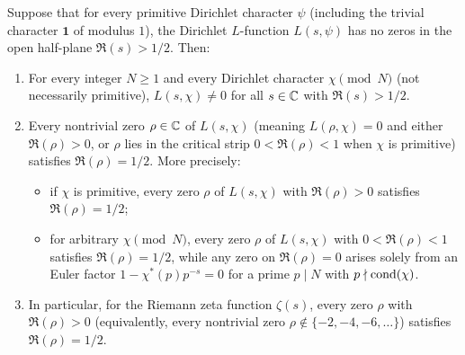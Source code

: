 \begin{proposition}
\label{prop:01:imprimitive}
Suppose that for every primitive Dirichlet character $\psi$ (including the trivial character $\mathbf{1}$ of modulus $1$), the Dirichlet $L$-function $L(s, \psi)$ has no zeros in the open half-plane $\Re(s) > 1/2$. Then:
\begin{enumerate}[label=\textup{(\roman*)}]
\item For every integer $N \ge 1$ and every Dirichlet character $\chi \pmod{N}$ (not necessarily primitive), $L(s, \chi) \neq 0$ for all $s \in \mathbb{C}$ with $\Re(s) > 1/2$.
\item Every nontrivial zero $\rho \in \mathbb{C}$ of $L(s, \chi)$ (meaning $L(\rho, \chi) = 0$ and either $\Re(\rho) > 0$, or $\rho$ lies in the critical strip $0 < \Re(\rho) < 1$ when $\chi$ is primitive) satisfies $\Re(\rho) = 1/2$. More precisely:
  \begin{itemize}
  \item if $\chi$ is primitive, every zero $\rho$ of $L(s,\chi)$ with $\Re(\rho) > 0$ satisfies $\Re(\rho) = 1/2$;
  \item for arbitrary $\chi \pmod{N}$, every zero $\rho$ of $L(s,\chi)$ with $0 < \Re(\rho) < 1$ satisfies $\Re(\rho) = 1/2$, while any zero on $\Re(\rho) = 0$ arises solely from an Euler factor $1 - \chi^*(p)p^{-s} = 0$ for a prime $p \mid N$ with $p \nmid \operatorname{cond}(\chi)$.
  \end{itemize}
\item In particular, for the Riemann zeta function $\zeta(s)$, every zero $\rho$ with $\Re(\rho) > 0$ (equivalently, every nontrivial zero $\rho \notin \{-2, -4, -6, \dots\}$) satisfies $\Re(\rho) = 1/2$.
\end{enumerate}
\end{proposition}

